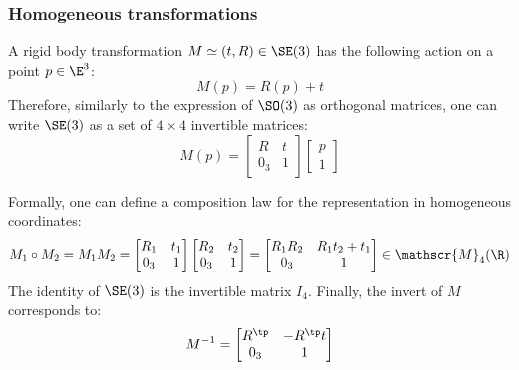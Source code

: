 \subsubsection{Homogeneous transformations}
A rigid body transformation $M\simeq (t, R)\in\SE(3)$ has the following action on a point $p\in\E^3$:
\begin{equation*}
    M(p) = R(p) + t
\end{equation*}
Therefore, similarly to the expression of $\SO(3)$ as orthogonal matrices, one can write $\SE(3)$ as a set of $4\times 4$ invertible matrices:
\begin{equation*}
    M(p) = \begin{bmatrix}
        R & t \\
        0_3 & 1
    \end{bmatrix} \begin{bmatrix}
        p \\
        1
    \end{bmatrix}
\end{equation*}

Formally, one can define a composition law for the representation in homogeneous coordinates:
\begin{equation*}
    M_1\circ M_2 = M_1M_2 = \begin{bmatrix}
        R_1 & t_1 \\
        0_3 & 1
    \end{bmatrix} \begin{bmatrix}
        R_2 & t_2 \\
        0_3 & 1
    \end{bmatrix} = \begin{bmatrix}
        R_1R_2 & R_1t_2+t_1 \\
        0_3 & 1
    \end{bmatrix} \in \mathscr{M}_4(\R)
\end{equation*}
The identity of $\SE(3)$ is the invertible matrix $I_4$. Finally, the invert of $M$ corresponds to:
\begin{equation*}
    M^{-1} = \begin{bmatrix}
        R^\tp & -R^\tp t \\
        0_3 & 1
    \end{bmatrix}
\end{equation*}

